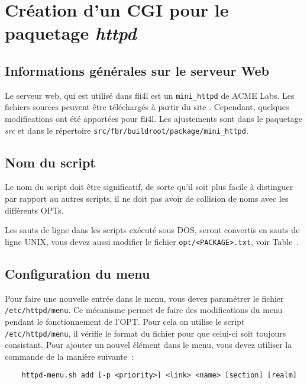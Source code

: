 
\section{Création d'un CGI pour le paquetage \emph{httpd}}

\subsection{Informations générales sur le serveur Web}

Le serveur web, qui est utilisé dans fli4l est un \texttt{mini\_httpd} de ACME Labs.
Les fichiers sources peuvent être téléchargés à partir du site
. Cependant, quelques modifications
ont été apportées pour fli4l. Les ajustements sont dans le paquetage \emph{src} et dans
le répertoire \texttt{src/fbr/buildroot/package/mini\_httpd}.


\subsection{Nom du script}

Le nom du script doit être significatif, de sorte qu'il soit plus facile à distinguer
par rapport au autres scripts, il ne doit pas avoir de collision de noms avec
les différents OPTs.

Les sauts de ligne dans les scripts exécuté sous DOS, seront convertis en sauts de
ligne UNIX, vous devez aussi modifier le fichier \texttt{opt/<PACKAGE>.txt}, voir
Table~.


\subsection{Configuration du menu}

Pour faire une nouvelle entrée dans le menu, vous devez paramétrer le fichier
\texttt{/etc/httpd/menu}. Ce mécanisme permet de faire des modifications du menu
pendant le fonctionnement de l'OPT. Pour cela on utilise le script \texttt{/etc/httpd/menu},
il vérifie le format du fichier pour que celui-ci soit toujours consistant.
Pour ajouter un nouvel élément dans le menu, vous devez utiliser la commande de
la manière suivante~:

\begin{example}
\begin{verbatim}
    httpd-menu.sh add [-p <priority>] <link> <name> [section] [realm]
\end{verbatim}
\end{example}

